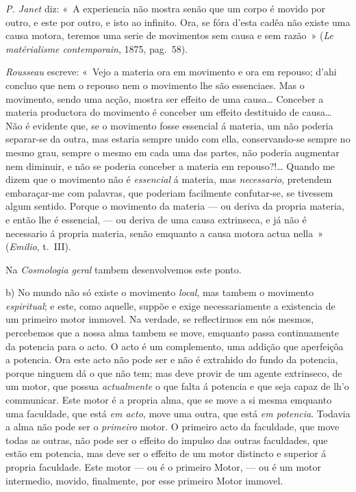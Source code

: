 {\emph{P. Janet} diz: «~A experiencia não mostra senão que um corpo é movido por outro, e
este por outro, e isto ao infinito. Ora, se fóra d'esta cadêa não existe uma causa
motora, teremos uma serie de movimentos sem causa e sem razão~» (\emph{Le matérialisme
contemporain}, 1875, pag.~58).

\emph{Rousseau} escreve: «~Vejo a materia ora em movimento e ora em repouso; d'ahi
concluo que nem o repouso nem o movimento lhe são essenciaes. Mas o movimento, sendo uma
acção, mostra ser effeito de uma causa\dots{} Conceber a materia productora do movimento
é conceber um effeito destituido de causa\dots{} Não é evidente que, se o movimento
fosse essencial á materia, um não poderia separar-se da outra, mas estaria sempre unido
com ella, conservando-se sempre no mesmo grau, sempre o mesmo em cada uma das partes,
não poderia augmentar nem diminuir, e não se poderia conceber a materia em
repouso?!\dots{} Quando me dizem que o movimento não é \emph{essencial} á materia, mas
\emph{necessario}, pretendem embaraçar-me com palavras, que poderiam facilmente
confutar-se, se tivessem algum sentido. Porque o movimento da materia --- ou deriva da
propria materia, e então lhe é essencial,
 --- ou deriva de uma causa extrinseca, e já não é necessario á propria materia,
senão emquanto a causa motora actua nella~» (\emph{Emilio}, t.~III).

Na \emph{Cosmologia geral} tambem desenvolvemos este ponto.

b) No mundo não só existe o movimento \emph{local}, mas tambem o movimento
\emph{espiritual}; e este, como aquelle, suppõe e exige necessariamente a existencia de
um primeiro motor immovel. Na verdade, se reflectirmos em nós mesmos, percebemos que a
nossa alma tambem se move, emquanto passa continuamente da potencia para o acto. O acto
é um complemento, uma addição que aperfeiçôa a potencia. Ora este acto não pode ser e
não é extrahido do fundo da potencia, porque ninguem dá o que não tem; mas deve provir
de um agente extrinseco, de um motor, que possua \emph{actualmente} o que falta á
potencia e que seja capaz de lh'o communicar. Este motor é a propria alma, que se move
a si mesma emquanto uma faculdade, que está \emph{em acto}, move uma outra, que está
\emph{em potencia}. Todavia a alma não pode ser o \emph{primeiro} motor. O primeiro acto
da faculdade, que move todas as outras, não pode ser o effeito do impulso das outras
faculdades, que estão em potencia, mas deve ser o effeito de um motor distincto e
superior á propria faculdade. Este motor --- ou é o primeiro Motor, --- ou é um motor
intermedio, movido, finalmente, por esse primeiro Motor immovel.

}
